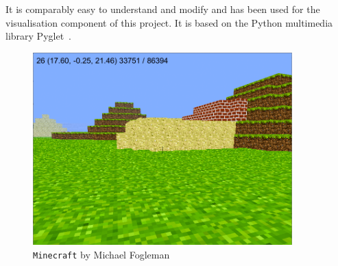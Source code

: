 It is comparably easy to understand and modify and has been used for the visualisation component of this project. It is based on the Python multimedia library Pyglet~\cite{pyglet}.

\begin{figure}[h]
  \centering
    \includegraphics[width=10cm]{graphics/fogleman_mc_screen}
  \caption{\texttt{Minecraft} by Michael Fogleman}
  \label{fogleman_mc_screen}
\end{figure}
